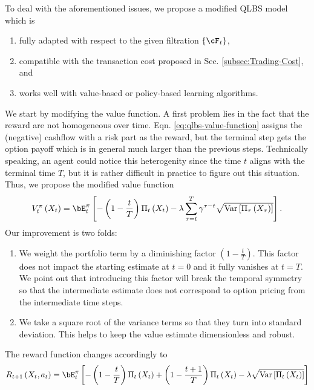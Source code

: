 To deal with the aforementioned issues, we propose a modified QLBS
model which is
\begin{enumerate}
\item fully adapted with respect to the given filtration $\left\{ \cF_{t}\right\} $,
\item compatible with the transaction cost proposed in Sec. \ref{subsec:Trading-Cost},
and
\item works well with value-based or policy-based learning algorithms.
\end{enumerate}
We start by modifying the value function. A first problem lies in
the fact that the reward are not homogeneous over time. Eqn. \ref{eq:qlbs-value-function}
assigns the (negative) cashflow with a risk part as the reward, but
the terminal step gets the option payoff which is in general much
larger than the previous steps. Technically speaking, an agent could
notice this heterogenity since the time $t$ aligns with the terminal
time $T$, but it is rather difficult in practice to figure out this
situation. Thus, we propose the modified value function 
\begin{equation}
V_{t}^{\pi}\left(X_{t}\right)=\bE_{t}^{\pi}\left[-\left(1-\frac{t}{T}\right)\Pi_{t}\left(X_{t}\right)-\lambda\sum_{\tau=t}^{T}\gamma^{\tau-t}\sqrt{\text{Var}\left[\Pi_{\tau}\left(X_{\tau}\right)\right]}\right].\label{eq:qlbs-modified-V}
\end{equation}
Our improvement is two folds:
\begin{enumerate}
\item We weight the portfolio term by a diminishing factor $\left(1-\frac{t}{T}\right)$.
This factor does not impact the starting estimate at $t=0$ and it
fully vanishes at $t=T$. We point out that introducing this factor
will break the temporal symmetry so that the intermediate estimate
does not correspond to option pricing from the intermediate time steps.
\item We take a square root of the variance terms so that they turn into
standard deviation. This helps to keep the value estimate dimensionless
and robust.
\end{enumerate}
The reward function changes accordingly to
\begin{equation}
R_{t+1}\left(X_{t},a_{t}\right)=\bE_{t}^{\pi}\left[-\left(1-\frac{t}{T}\right)\Pi_{t}\left(X_{t}\right)+\left(1-\frac{t+1}{T}\right)\Pi_{t}\left(X_{t}\right)-\lambda\sqrt{\text{Var}\left[\Pi_{t}\left(X_{t}\right)\right]}\right]\label{eq:qlbs-modified-reward}
\end{equation}

